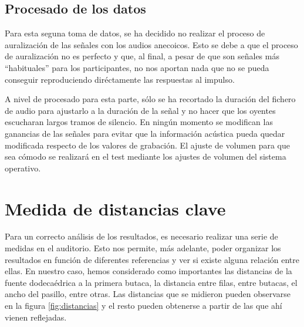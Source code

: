 \documentclass[11pt,a4paper,twoside]{book}
\begin{document}
        \subsection{Procesado de los datos}
            Para esta seguna toma de datos, se ha decidido no realizar el proceso de auralización de las señales con los audios anecoicos. Esto se debe a que el proceso de auralización no es perfecto y que, al final, a pesar de que son señales más ``habituales'' para los participantes, no nos aportan nada que no se pueda conseguir reproduciendo diréctamente las respuestas al impulso.
            
            A nivel de procesado para esta parte, sólo se ha recortado la duración del fichero de audio para ajustarlo a la duración de la señal y no hacer que los oyentes escucharan largos tramos de silencio. En ningún momento se modifican las ganancias de las señales para evitar que la información acústica pueda quedar modificada respecto de los valores de grabación. El ajuste de volumen para que sea cómodo se realizará en el test mediante los ajustes de volumen del sistema operativo.
            
    \section{Medida de distancias clave}
        Para un correcto análisis de los resultados, es necesario realizar una serie de medidas en el auditorio. Esto nos permite, más adelante, poder organizar los resultados en función de diferentes referencias y ver si existe alguna relación entre ellas. En nuestro caso, hemos considerado como importantes las distancias de la fuente dodecaédrica a la primera butaca, la distancia entre filas, entre butacas, el ancho del pasillo, entre otras. Las distancias que se midieron pueden observarse en la figura \ref{fig:distancias} y el resto pueden obtenerse a partir de las que ahí vienen reflejadas.
        
\end{document}
